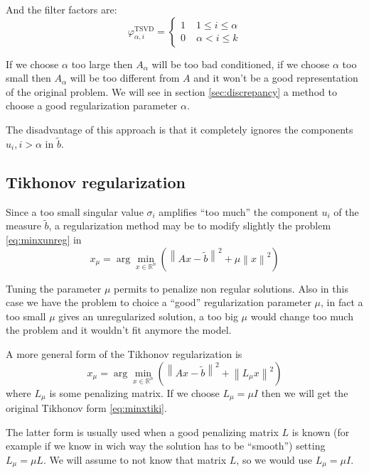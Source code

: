 \documentclass[a4paper,10pt]{article}
\theoremstyle{plain}
\theoremstyle{definition}
\theoremstyle{remark}
\newcommand{\pa}[1]{\left(#1\right)}
\newcommand{\norm}[1]{\left\|#1\right\|}
\begin{document}
And the filter factors are:
\begin{equation}
  \label{eq:TSVDfilter}
  \varphi ^{\text{TSVD}}_{\alpha,i} = \left\{
    \begin{matrix}
      1 \; &1\le i \le \alpha\\
      0 \; &\alpha < i \le k
    \end{matrix}
    \right.
\end{equation}

If we choose $\alpha$ too large then $A_\alpha$ will be too bad
conditioned, if we choose $\alpha$ too small then $A_\alpha$ will be
too different from $A$ and it won't be a good representation of the
original problem. We will see in section \ref{sec:discrepancy} a
method to choose a good regularization parameter $\alpha$.

The disadvantage of this approach is that it completely ignores the
components $u_i, i>\alpha$ in $\tilde b$.

\subsection{Tikhonov regularization}
\label{sec:tikhonov}

Since a too small singular value $\sigma _i$ amplifies ``too much''
the component $u_i$ of the measure $\tilde b$, a regularization method
may be to modify slightly the problem \ref{eq:minxunreg} in
\begin{equation}
  \label{eq:minxtiki}
  x_\mu = \arg\min _{x \in \mathbb{R}^n} \pa{ \norm{Ax -\tilde b}^2 + \mu\norm{x}^2}
\end{equation}

Tuning the parameter $\mu$ permits to penalize non regular
solutions. Also in this case we have the problem to choice a ``good''
regularization parameter $\mu$, in fact a too small $\mu$ gives an
unregularized solution, a too big $\mu$ would change too much the
problem and it wouldn't fit anymore the model.

A more general form of the Tikhonov regularization is
\begin{equation}
  \label{eq:minxtikgen}
  x_\mu = \arg\min _{x \in \mathbb{R}^n} \pa{ \norm{Ax -\tilde b}^2 +
    \norm{L_\mu x}^2}
\end{equation}
where $L_\mu$ is some penalizing matrix. If we choose $L_\mu = \mu
I$ then we will get the original Tikhonov form \ref{eq:minxtiki}.

The latter form is usually used when a good penalizing matrix $L$ is
known (for example if we know in wich way the solution has to be
``smooth'') setting $L_\mu = \mu L$. We will assume to not know that
matrix $L$, so we would use $L_\mu = \mu I$.
\end{document}
